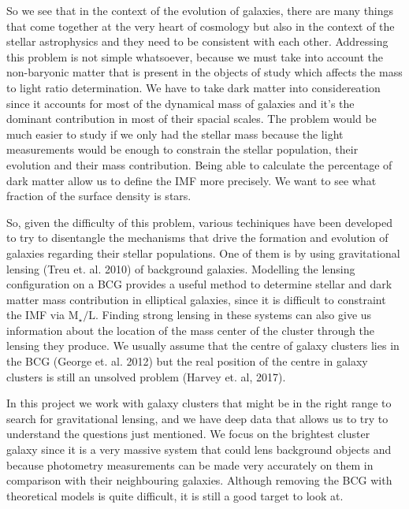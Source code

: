 So we see that in the context of the evolution of galaxies, there are many things that come together at the very heart of cosmology but also in the context of the stellar astrophysics and they need to be consistent with each other. Addressing this problem is not simple whatsoever, because we must take into account the non-baryonic matter that is present in the objects of study which affects the mass to light ratio determination. We have to take dark matter into considereation since it accounts for most of the dynamical mass of galaxies and it's the dominant contribution in most of their spacial scales. The problem would be much easier to study if we only had the stellar mass because the light measurements would be enough to constrain the stellar population, their evolution and their mass contribution. Being able to calculate the percentage of dark matter allow us to define the IMF more precisely. We want to see what fraction of the surface density is stars.

So, given the difficulty of this problem, various techiniques have been developed to try to disentangle the mechanisms that drive the formation and evolution of galaxies regarding their stellar populations. One of them is by using gravitational lensing (Treu et. al. 2010) of background galaxies. Modelling the lensing configuration on a BCG provides a useful method to determine stellar and dark matter mass contribution in elliptical galaxies, since it is difficult to constraint the IMF via $\textrm{M}_{\star}/\text{L}$. Finding strong lensing in these systems can also give us information about the location of the mass center of the cluster through the lensing they produce. We usually assume that the centre of galaxy clusters lies in the BCG (George et. al. 2012) but the real position of the centre in galaxy clusters is still an unsolved problem (Harvey et. al, 2017). 

In this project we work with galaxy clusters that might be in the right range to search for gravitational lensing, and we have deep data that allows us to try to understand the questions just mentioned. We focus on the brightest cluster galaxy since it is a very massive system that could lens background objects and because photometry measurements can be made very accurately on them in comparison with their neighbouring galaxies. Although removing the BCG with theoretical models is quite difficult, it is still a good target to look at. 
   
\newpage
